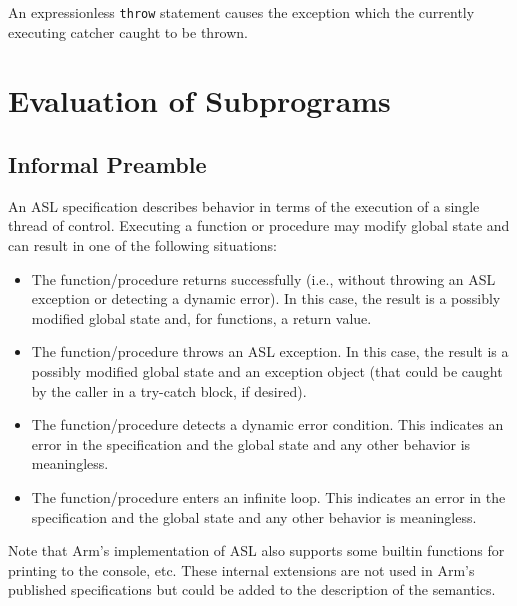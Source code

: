 \documentclass{book}
\begin{document}
An expressionless \texttt{throw} statement causes the exception which the
currently executing catcher caught to be thrown.

\chapter{Evaluation of Subprograms \label{chap:eval_call}}

\section{Informal Preamble}


An ASL specification describes behavior in terms of the execution of a single
thread of control. Executing a function or procedure may modify global state
and can result in one of the following situations:
\begin{itemize}
\item The function/procedure returns successfully (i.e., without throwing an
ASL exception or detecting a dynamic error). In this case, the result is a
possibly modified global state and, for functions, a return value.
\item The function/procedure throws an ASL exception. In this case, the result
is a possibly modified global state and an exception object (that could be
caught by the caller in a try-catch block, if desired).
\item The function/procedure detects a dynamic error condition. This indicates
an error in the specification and the global state and any other behavior is
meaningless.
\item The function/procedure enters an infinite loop. This indicates an error
in the specification and the global state and any other behavior is
meaningless.
\end{itemize}

Note that Arm’s implementation of ASL also supports some builtin functions for
printing to the console, etc. These internal extensions are not used in Arm’s
published specifications but could be added to the description of the
semantics.
\end{document}

